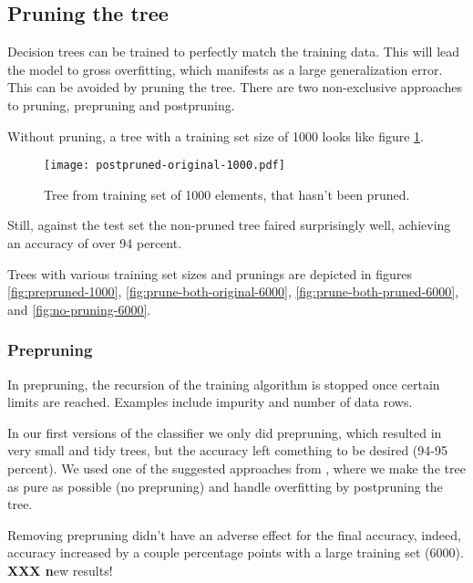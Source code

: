 \documentclass[a4paper,10pt]{article}
\newcommand{\XXX}[1]{{\bf XXX #1}}
\begin{document}
\subsection{Pruning the tree}

Decision trees can be trained to perfectly match the training
data\cite[p. 182]{alpaydin2004}.  This will lead the model to
gross overfitting, which manifests as a large generalization error.
This can be avoided by pruning the tree.  There are two non-exclusive
approaches to pruning, prepruning and postpruning.

Without pruning, a tree with a training set size of 1000 looks like
figure \ref{fig:no-pruning-1000}.

\begin{figure}[h]
  \centering
  \begin{minipage}[c]{1.0\textwidth}
    \centering
\texttt{[image: postpruned-original-1000.pdf]}
  \end{minipage}
  \caption{Tree from training set of 1000 elements, that hasn't been
    pruned.}
  \label{fig:no-pruning-1000}
\end{figure}

Still, against the test set the non-pruned tree faired surprisingly
well, achieving an accuracy of over 94 percent.

Trees with various training set sizes and prunings are depicted in
figures \ref{fig:prepruned-1000}, \ref{fig:prune-both-original-6000},
\ref{fig:prune-both-pruned-6000}, and \ref{fig:no-pruning-6000}.

\subsubsection{Prepruning}

In prepruning, the recursion of the training algorithm is stopped once
certain limits are reached.  Examples include impurity and number of
data rows.

In our first versions of the classifier we only did prepruning, which
resulted in very small and tidy trees, but the accuracy left comething
to be desired (94-95 percent).  We used one of the suggested
approaches from \cite{alpaydin2004}, where we make the tree as pure as
possible (no prepruning) and handle overfitting by postpruning the tree.

Removing prepruning didn't have an adverse effect for the final
accuracy, indeed, accuracy increased by a couple percentage points with
a large training set (6000). {\XXX new results!}
\end{document}
